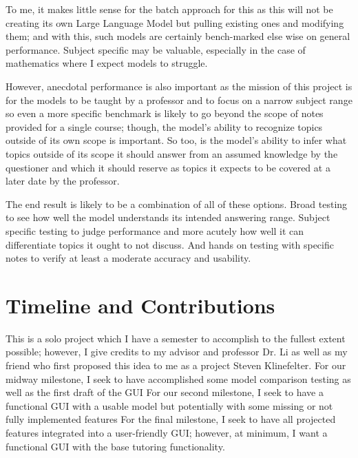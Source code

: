 \documentclass[sigconf,natbib=false]{acmart}
\begin{document}
To me, it makes little sense for the batch approach for this as this will not be creating its own Large Language Model but pulling existing ones and modifying them; and with this, such models are certainly bench-marked else wise on general performance. Subject specific may be valuable, especially in the case of mathematics where I expect models to struggle.

However, anecdotal performance is also important as the mission of this project is for the models to be taught by a professor and to focus on a narrow subject range so even a more specific benchmark is likely to go beyond the scope of notes provided for a single course; though, the model's ability to recognize topics outside of its own scope is important. So too, is the model's ability to infer what topics outside of its scope it should answer from an assumed knowledge by the questioner and which it should reserve as topics it expects to be covered at a later date by the professor.

The end result is likely to be a combination of all of these options. Broad testing to see how well the model understands its intended answering range. Subject specific testing to judge performance and more acutely how well it can differentiate topics it ought to not discuss. And hands on testing with specific notes to verify at least a moderate accuracy and usability.


\section{Timeline and Contributions}
This is a solo project which I have a semester to accomplish to the fullest extent possible; however, I give credits to my advisor and professor Dr. Li as well as my friend who first proposed this idea to me as a project Steven Klinefelter.
For our midway milestone, I seek to have accomplished some model comparison testing as well as the first draft of the GUI
For our second milestone, I seek to have a functional GUI with a usable model but potentially with some missing or not fully implemented features
For the final milestone, I seek to have all projected features integrated into a user-friendly GUI; however, at minimum, I want a functional GUI with the base tutoring functionality.

\printbibliography
\end{document}
